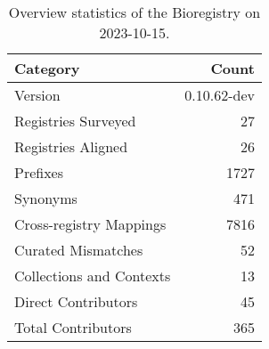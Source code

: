 \begin{table}
\caption{Overview statistics of the Bioregistry on 2023-10-15.}
\label{tab:bioregistry-summary}
\begin{tabular}{lr}
\toprule
Category & Count \\
\midrule
Version & 0.10.62-dev \\
Registries Surveyed & 27 \\
Registries Aligned & 26 \\
Prefixes & 1727 \\
Synonyms & 471 \\
Cross-registry Mappings & 7816 \\
Curated Mismatches & 52 \\
Collections and Contexts & 13 \\
Direct Contributors & 45 \\
Total Contributors & 365 \\
\bottomrule
\end{tabular}
\end{table}
